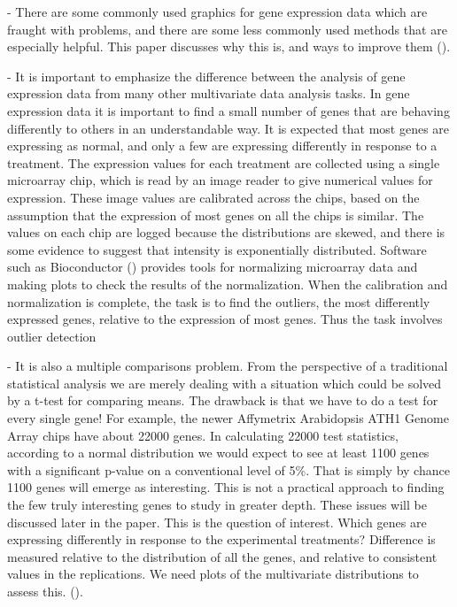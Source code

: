 \documentclass[11pt,a4paper,oldfontcommands,openany]{memoir}
\numberwithin{equation}{section} %
\begin{document}
- There are some commonly used graphics for gene expression data which are fraught with problems, and there are some less commonly used methods that are especially helpful. This paper discusses why this is, and ways to improve them (\citealt{jds}).

- It is important to emphasize the difference between the analysis of gene expression data from many other multivariate data analysis tasks. In gene expression data it is important to find a small number of genes that are behaving differently to others in an understandable way. It is expected that most genes are expressing as normal, and only a few are expressing differently in response to a treatment. The expression values for each treatment are collected using a single microarray chip, which is read by an image reader to give numerical values for expression. These image values are calibrated across the chips, based on the assumption that the expression of most genes on all the chips is similar. The values on each chip are logged because the distributions are skewed, and there is some evidence to suggest that intensity is exponentially distributed. Software such as Bioconductor (\citealt{bioconductor}) provides tools for normalizing microarray data and making plots to check the results of the normalization. When the calibration and normalization is complete, the task is to find the outliers, the most differently expressed genes, relative to the expression of most genes. Thus the task involves outlier detection 

- It is also a multiple comparisons problem. From the perspective of a traditional statistical analysis we are merely dealing with a situation which could be solved by a t-test for comparing means. The drawback is that we have to do a test for every single gene! For example, the newer Affymetrix Arabidopsis ATH1 Genome Array chips have about 22000 genes. In calculating 22000 test statistics, according to a normal distribution we would expect to see at least 1100 genes with a significant p-value on a conventional level of 5\%. That is simply by chance 1100 genes will emerge as interesting. This is not a practical approach to finding the few truly interesting genes to study in greater depth. These issues will be discussed later in the paper. This is the question of interest. Which genes are expressing differently in response to the experimental treatments? Difference is measured relative to the distribution of all the genes, and relative to consistent values in the replications. We need plots of the multivariate distributions to assess this. (\citealt{jds}).
\end{document}
